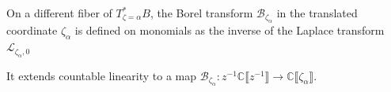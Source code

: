 \documentclass{article}
\newcommand{\maps}{\colon}
\newcommand{\C}{\mathbb{C}}
\newcommand{\laplace}{\mathcal{L}}
\newcommand{\borel}{\mathcal{B}}
\theoremstyle{definition}
\theoremstyle{plain}
\begin{document}
On a different fiber of $T_{\zeta=\alpha}^*B$, the Borel transform $\borel_{\zeta_\alpha}$ in the translated coordinate $\zeta_\alpha$ is defined on monomials as the inverse of the Laplace transform $\laplace_{\zeta_\alpha,0}$
\begin{center}
\end{center}
It extends countable linearity to a map $\borel_{\zeta_\alpha} \maps z^{-1} \C \llbracket z^{-1} \rrbracket  \to \C \llbracket \zeta_\alpha \rrbracket$.


\end{document}
